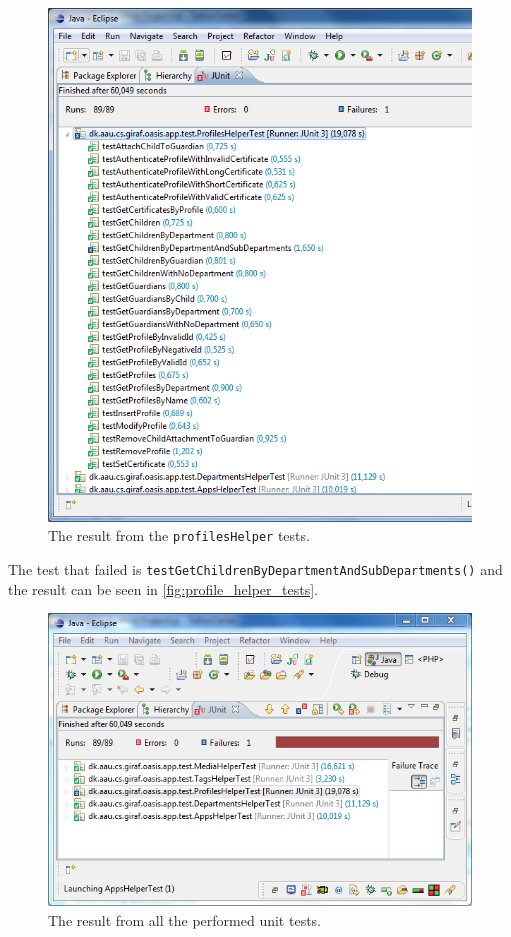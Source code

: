 \begin{figure}[htbp]
	\centering
		\includegraphics[width=\textwidth]{Images/unit_testing/profile_helper_tests.PNG}
	\caption{The result from the \texttt{profilesHelper} tests.}
	\label{fig:profile_helper_tests}
\end{figure}

The test that failed is \texttt{testGetChildrenByDepartmentAndSubDepartments()} and the result can be seen in \autoref{fig:profile_helper_tests}.

\begin{figure}[htbp]
	\centering
		\includegraphics[width=\textwidth]{Images/unit_testing/all_tests.PNG}
	\caption{The result from all the performed unit tests.}
	\label{fig:all_tests}
\end{figure}

